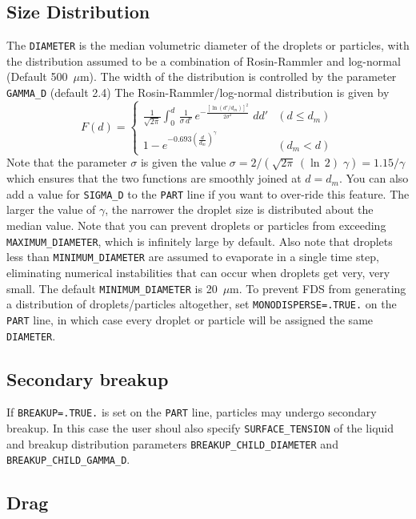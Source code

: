 \documentclass[11pt]{book}
\newcommand{\ct}{\tt\small}
\newcommand{\be}{\begin{equation}}
\newcommand{\ee}{\end{equation}}
\begin{document}
\subsection{Size Distribution}
\label{info:particle_size}

The {\ct DIAMETER} is the median volumetric diameter of the droplets or particles, with the
distribution assumed to be a combination of Rosin-Rammler and log-normal (Default 500~$\mu$m). The
width of the distribution is controlled by the parameter {\ct GAMMA\_D} (default 2.4)
The Rosin-Rammler/log-normal distribution is given by
\be F(d) = \left\{ \begin{array}{ll}
   \frac{1}{\sqrt{2\pi}} {\displaystyle \int_0^d} \, \frac{1}{\sigma\, d'} \,
   e^{-\frac{[\ln(d'/d_m)]^2}{2\sigma^2}} \; dd'       & (d \le d_m) \\
   1 - e^{-0.693 \left(\frac{d}{d_m}\right)^\gamma }  & (d_m < d)
   \end{array} \right.
\ee
Note that the parameter $\sigma$ is given the value
$\sigma=2/(\sqrt{2\pi} \, (\ln\,2) \; \gamma)=1.15/\gamma$
which ensures that the two functions are smoothly joined at $d=d_m$. You can also add a value for {\ct SIGMA\_D} to the {\ct PART} line if you want to
over-ride this feature.
The larger the value of $\gamma$, the narrower the droplet size is
distributed about the median value. Note that you can prevent droplets or particles from
exceeding {\ct MAXIMUM\_DIAMETER}, which is infinitely large by default. Also note that
droplets less than {\ct MINIMUM\_DIAMETER} are assumed to evaporate in a single time step, eliminating numerical
instabilities that can occur when droplets get very, very small. The default {\ct MINIMUM\_DIAMETER} is 20~$\mu$m.
To prevent FDS from generating a distribution of droplets/particles altogether, set
{\ct MONODISPERSE=.TRUE.} on the {\ct PART} line, in which case every droplet or particle will be assigned the
same {\ct DIAMETER}.

\subsection{Secondary breakup}
\label{info:secondary_breakup}
If {\ct BREAKUP=.TRUE.} is set on the {\ct PART} line, particles may undergo secondary breakup. In this case the user shoul also specify {\ct SURFACE\_TENSION} of the liquid and breakup distribution parameters {\ct BREAKUP\_CHILD\_DIAMETER} and {\ct BREAKUP\_CHILD\_GAMMA\_D}.


\subsection{Drag}
\label{info:particle_drag}
\end{document}
